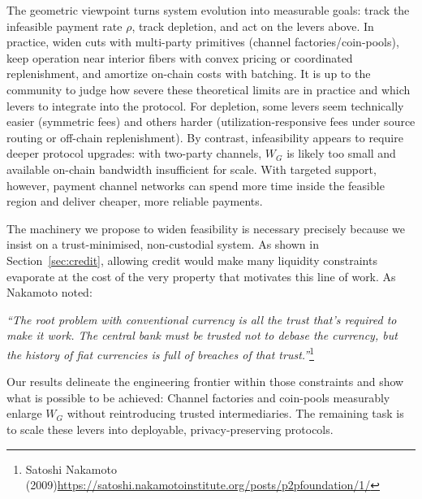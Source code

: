 \documentclass[10pt,twocolumn]{article}
\begin{document}
The geometric viewpoint turns system evolution into measurable goals: track the infeasible payment rate $\rho$, track depletion, and act on the levers above. In practice, widen cuts with multi-party primitives (channel factories/coin-pools), keep operation near interior fibers with convex pricing or coordinated replenishment, and amortize on-chain costs with batching. It is up to the community to judge how severe these theoretical limits are in practice and which levers to integrate into the protocol. For depletion, some levers seem technically easier (symmetric fees) and others harder (utilization-responsive fees under source routing or off-chain replenishment). By contrast, infeasibility appears to require deeper protocol upgrades: with two-party channels, $W_G$ is likely too small and available on-chain bandwidth insufficient for scale. With targeted support, however, payment channel networks can spend more time inside the feasible region and deliver cheaper, more reliable payments.

The machinery we propose to widen feasibility is necessary precisely because we insist on a trust-minimised, non-custodial system. As shown in Section~\ref{sec:credit}, allowing credit would make many liquidity constraints evaporate at the cost of the very property that motivates this line of work. As Nakamoto noted:
\begin{displayquote}
\emph{“The root problem with conventional currency is all the trust that’s required to make it work. The central bank must be trusted not to debase the currency, but the history of fiat currencies is full of breaches of that trust.”}\footnote{Satoshi Nakamoto (2009)\url{https://satoshi.nakamotoinstitute.org/posts/p2pfoundation/1/}} 
\end{displayquote}
Our results delineate the engineering frontier within those constraints and show what is possible to be achieved: Channel factories and coin-pools measurably enlarge $W_G$ without reintroducing trusted intermediaries. The remaining task is to scale these levers into deployable, privacy-preserving protocols.
\end{document}
